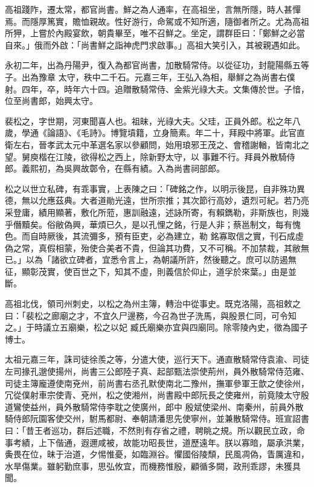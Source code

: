 \begin{pinyinscope}
 高祖踐阼，遷太常，都官尚書。鮮之為人通率，在高祖坐，言無所隱，時人甚憚焉。而隱厚篤實，贍恤親故。性好游行，命駕或不知所適，隨御者所之。尤為高祖所狎，上嘗於內殿宴飲，朝貴畢至，唯不召鮮之。坐定，謂群臣曰：「鄭鮮之必當自來。」俄而外啟：「尚書鮮之詣神虎門求啟事。」高祖大笑引入，其被親遇如此。



 永初二年，出為丹陽尹，復入為都官尚書，加散騎常侍。以從征功，封龍陽縣五等子。出為豫章
 太守，秩中二千石。元嘉三年，王弘入為相，舉鮮之為尚書右僕射。四年，卒，時年六十四。追贈散騎常侍、金紫光祿大夫。文集傳於世。子愔，位至尚書郎，始興太守。



 裴松之，字世期，河東聞喜人也。祖昧，光祿大夫。父珪，正員外郎。松之年八歲，學通《論語》、《毛詩》。博覽墳籍，立身簡素。年二十，拜殿中將軍。此官直衛左右，晉孝武太元中革選名家以參顧問，始用琅邪王茂之、會稽謝輶，皆南北之望。舅庾楷在江陵，欲得松之西上，除新野太守，以
 事難不行。拜員外散騎侍郎。義熙初，為吳興故鄣令，在縣有績。入為尚書祠部郎。



 松之以世立私碑，有乖事實，上表陳之曰：「碑銘之作，以明示後昆，自非殊功異德，無以允應茲典。大者道勛光遠，世所宗推；其次節行高妙，遺烈可紀。若乃亮采登庸，績用顯著，敷化所蒞，惠訓融遠，述詠所寄，有賴鐫勒，非斯族也，則幾乎僭黷矣。俗敝偽興，華煩已久，是以孔悝之銘，行是人非；蔡邕制文，每有愧色。而自時厥後，其流彌多，預有臣吏，必為建立，勒
 銘寡取信之實，刊石成虛偽之常，真假相蒙，殆使合美者不貴，但論其功費，又不可稱。不加禁裁，其敝無已。」以為「諸欲立碑者，宜悉令言上，為朝議所許，然後聽之。庶可以防遏無征，顯彰茂實，使百世之下，知其不虛，則義信於仰止，道孚於來葉。」由是並斷。



 高祖北伐，領司州刺史，以松之為州主簿，轉治中從事史。既克洛陽，高祖敕之曰：「裴松之廊廟之才，不宜久尸邊務，今召為世子洗馬，與殷景仁同，可令知之。」于時議立五廟樂，松之以妃
 臧氏廟樂亦宜與四廟同。除零陵內史，徵為國子博士。



 太祖元嘉三年，誅司徒徐羨之等，分遣大使，巡行天下。通直散騎常侍袁渝、司徒左司掾孔邈使揚州，尚書三公郎陸子真、起部甄法崇使荊州，員外散騎常侍范雍、司徒主簿龐遵使南兗州，前尚書右丞孔默使南北二豫州，撫軍參軍王歆之使徐州，冗從僕射車宗使青、兗州，松之使湘州，尚書殿中郎阮長之使雍州，前竟陵太守殷道鸞使益州，員外散騎常侍李耽之使廣州，郎中
 殷斌使梁州、南秦州，前員外散騎侍郎阮園客使交州，駙馬都尉、奉朝請潘思先使寧州，並兼散騎常侍。班宣詔書曰：「昔王者巡功，群后述職，不然則有存省之禮，聘眺之規。所以觀民立政，命事考績，上下偕通，遐邇咸被，故能功昭長世，道歷遠年。朕以寡暗，屬承洪業，夤畏在位，昧于治道，夕惕惟憂，如臨淵谷。懼國俗陵頹，民風凋偽，眚厲違和，水旱傷業。雖躬勤庶事，思弘攸宜，而機務惟殷，顧循多闕，政刑乖謬，未獲具聞。




\end{pinyinscope}
